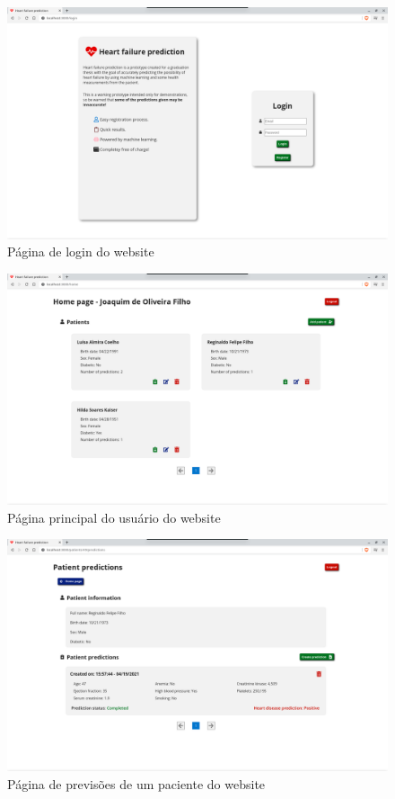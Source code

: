 \begin{figure}[ht!]
	\centering
  \includegraphics[scale=0.26]{images/website_pagina_login.png}
  \caption{Página de login do website}
  \label{fig:website_login_page}
\end{figure}

\begin{figure}[ht!]
  \centering
  \includegraphics[scale=0.26]{images/website_pagina_home.png}
  \caption{Página principal do usuário do website}
  \label{fig:website_home_page}
\end{figure}

\begin{figure}[ht!]
  \centering
  \includegraphics[scale=0.26]{images/website_pagina_previsoes_paciente.png}
  \caption{Página de previsões de um paciente do website}
  \label{fig:website_patient_predictions_page}
\end{figure}

